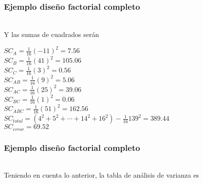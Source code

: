 \documentclass[12pt]{beamer}
\begin{document}
\begin{frame}
\justifying
\frametitle{Ejemplo diseño factorial completo}
~\\Y las sumas de cuadrados serán
\begin{center}
$SC_A=\frac{1}{16}(-11)^2=7.56$
~\\$SC_B=\frac{1}{16}(41)^2=105.06$
~\\$SC_C=\frac{1}{16}(3)^2=0.56$
~\\$SC_{AB}=\frac{1}{16}(9)^2=5.06$
~\\$SC_{AC}=\frac{1}{16}(25)^2=39.06$
~\\$SC_{BC}=\frac{1}{16}(1)^2=0.06$
~\\$SC_{ABC}=\frac{1}{16}(51)^2=162.56$
~\\$SC_{total}=(4^2+5^2+\cdots+14^2+16^2)-\frac{1}{16}139^2=389.44$
~\\$SC_{error}=69.52$
\end{center}
\end{frame}

\begin{frame}
\frametitle{Ejemplo diseño factorial completo}
~\\Teniendo en cuenta lo anterior, la tabla de análisis de varianza es
\begin{table}[H]
  \centering
  \caption{Análisis de varianza factorial completo}
  \label{tab:addlabel}%
\end{table}%
\end{frame}
\end{document}
